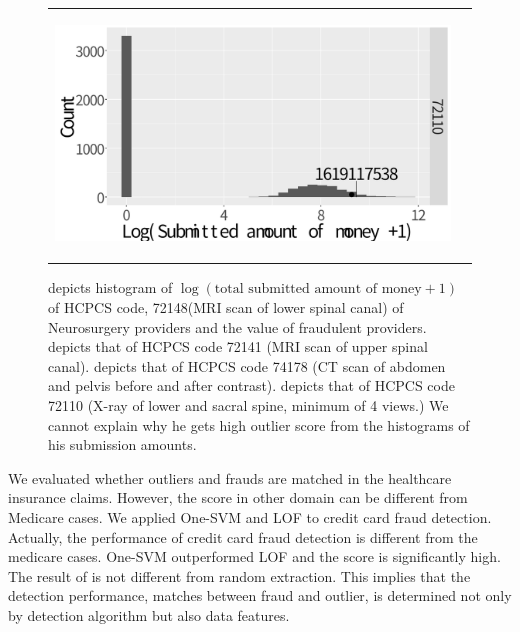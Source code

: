 \documentclass[dvipdfmx, english]{ampmt}             %
\begin{document}
\begin{figure}[H]
\begin{tabular}{cc}
\begin{minipage}{.5\hsize}
	\subcaption{}\label{fig:Diagnostic3}
      \end{minipage} 
       \begin{minipage}{.5\hsize}
        \centering
        \centerline{\includegraphics[scale=0.22]{../img/fraud/Diagnostic-Radiology-72110.pdf}}
	\subcaption{}\label{fig:Diagnostic4}
      \end{minipage} \\
    \end{tabular} 
   
     \caption{ depicts histogram of $\log (\mbox{total submitted amount of money} +1)$ of HCPCS code, 72148(MRI scan of lower spinal canal) of Neurosurgery providers and the value of fraudulent providers. 
      depicts that of HCPCS code 72141 (MRI scan of upper spinal canal). 
      depicts that of HCPCS code 74178 (CT scan of abdomen and pelvis before and after contrast).
      depicts that of HCPCS code 72110 (X-ray of lower and sacral spine, minimum of 4 views.) We cannot explain why he gets high outlier score from the histograms of his submission amounts.}
      \label{fig:Diagnostic}
\end{figure}
\par
We evaluated whether outliers and frauds are matched in the healthcare insurance claims. However, the score in other domain can be different from Medicare cases. We applied One-SVM and LOF to credit card fraud detection.
Actually, the performance of credit card fraud detection is different from the medicare cases. One-SVM outperformed LOF and the score is significantly high. The result of is not different from random extraction. This implies that 
the detection performance, matches between fraud and outlier, is determined not only by detection algorithm but also data features.
\end{document}
